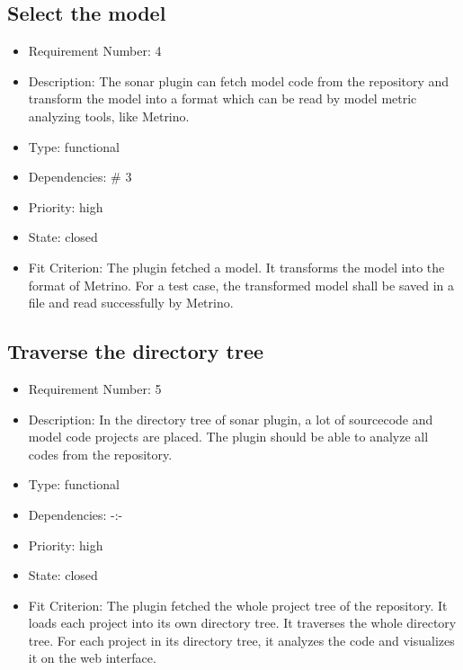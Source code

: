 \subsection{Select the model}
\begin{itemize}
\item Requirement Number: 4
\item Description: The sonar plugin can fetch model code from the repository and transform the model into a format which can be read by model metric analyzing tools, like Metrino.
\item Type: functional
\item Dependencies: \# 3
\item Priority: high
\item State: closed
\item Fit Criterion: The plugin fetched a model. It transforms the model into the format of Metrino. For a test case, the transformed model shall be saved in a file and read successfully by Metrino.
\end{itemize}

\subsection{Traverse the directory tree}
\begin{itemize}
\item Requirement Number: 5
\item Description: In the directory tree of sonar plugin, a lot of sourcecode and model code projects are placed. The plugin should be able to analyze all codes from the repository.
\item Type: functional
\item Dependencies: -:-
\item Priority: high
\item State: closed
\item Fit Criterion: The plugin fetched the whole project tree of the repository. It loads each project into its own directory tree. It traverses the whole directory tree. For each project in its directory tree, it analyzes the code and visualizes it on the web interface.
\end{itemize}

